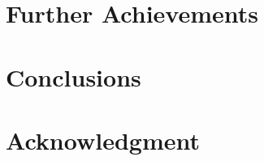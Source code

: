 \documentclass[10pt,conference]{IEEEtran}
\begin{document}
\section{Further Achievements}
\label{sec:futureworks}

\section{Conclusions}
\label{sec:conclusion}

\section*{Acknowledgment}


%

\end{document}
